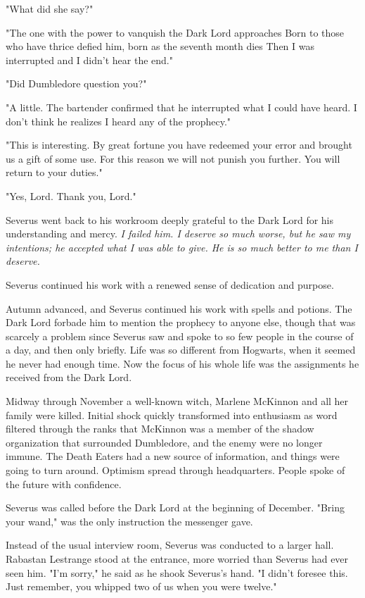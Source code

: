 "What did she say?"

"The one with the power to vanquish the Dark Lord approaches{\el} Born to those who have thrice defied him, born as the seventh month dies{\el} Then I was interrupted and I didn't hear the end."

"Did Dumbledore question you?"

"A little. The bartender confirmed that he interrupted what I could have heard. I don't think he realizes I heard any of the prophecy."

"This is interesting. By great fortune you have redeemed your error and brought us a gift of some use. For this reason we will not punish you further. You will return to your duties."

"Yes, Lord. Thank you, Lord."

Severus went back to his workroom deeply grateful to the Dark Lord for his understanding and mercy. \emph{I failed him. I deserve so much worse, but he saw my intentions; he accepted what I was able to give. He is so much better to me than I deserve.}

Severus continued his work with a renewed sense of dedication and purpose.

Autumn advanced, and Severus continued his work with spells and potions. The Dark Lord forbade him to mention the prophecy to anyone else, though that was scarcely a problem since Severus saw and spoke to so few people in the course of a day, and then only briefly. Life was so different from Hogwarts, when it seemed he never had enough time. Now the focus of his whole life was the assignments he received from the Dark Lord.

Midway through November a well-known witch, Marlene McKinnon and all her family were killed. Initial shock quickly transformed into enthusiasm as word filtered through the ranks that McKinnon was a member of the shadow organization that surrounded Dumbledore, and the enemy were no longer immune. The Death Eaters had a new source of information, and things were going to turn around. Optimism spread through headquarters. People spoke of the future with confidence.

Severus was called before the Dark Lord at the beginning of December. "Bring your wand," was the only instruction the messenger gave.

Instead of the usual interview room, Severus was conducted to a larger hall. Rabastan Lestrange stood at the entrance, more worried than Severus had ever seen him. "I'm sorry," he said as he shook Severus's hand. "I didn't foresee this. Just remember, you whipped two of us when you were twelve."

